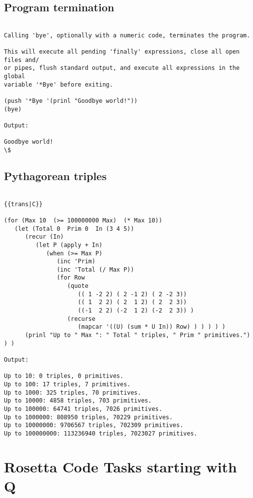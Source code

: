 \section*{Program termination}

\begin{verbatim}

Calling 'bye', optionally with a numeric code, terminates the program.

This will execute all pending 'finally' expressions, close all open files and/
or pipes, flush standard output, and execute all expressions in the global
variable '*Bye' before exiting.

(push '*Bye '(prinl "Goodbye world!"))
(bye)

Output:

Goodbye world!
\$

\end{verbatim}

\section*{Pythagorean triples}

\begin{verbatim}

{{trans|C}}

(for (Max 10  (>= 100000000 Max)  (* Max 10))
   (let (Total 0  Prim 0  In (3 4 5))
      (recur (In)
         (let P (apply + In)
            (when (>= Max P)
               (inc 'Prim)
               (inc 'Total (/ Max P))
               (for Row
                  (quote
                     (( 1 -2 2) ( 2 -1 2) ( 2 -2 3))
                     (( 1  2 2) ( 2  1 2) ( 2  2 3))
                     ((-1  2 2) (-2  1 2) (-2  2 3)) )
                  (recurse
                     (mapcar '((U) (sum * U In)) Row) ) ) ) ) )
      (prinl "Up to " Max ": " Total " triples, " Prim " primitives.") ) )

Output:

Up to 10: 0 triples, 0 primitives.
Up to 100: 17 triples, 7 primitives.
Up to 1000: 325 triples, 70 primitives.
Up to 10000: 4858 triples, 703 primitives.
Up to 100000: 64741 triples, 7026 primitives.
Up to 1000000: 808950 triples, 70229 primitives.
Up to 10000000: 9706567 triples, 702309 primitives.
Up to 100000000: 113236940 triples, 7023027 primitives.

\end{verbatim}

\chapter{Rosetta Code Tasks starting with Q}

